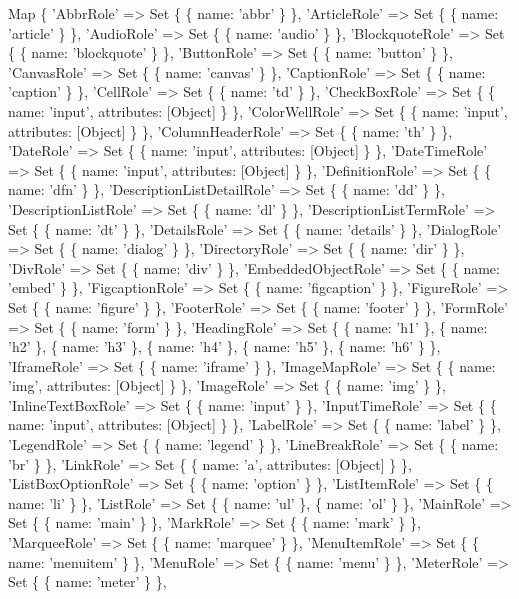 \begin{DoxyCode}
Map \{
  'AbbrRole' => Set \{ \{ name: 'abbr' \} \},
  'ArticleRole' => Set \{ \{ name: 'article' \} \},
  'AudioRole' => Set \{ \{ name: 'audio' \} \},
  'BlockquoteRole' => Set \{ \{ name: 'blockquote' \} \},
  'ButtonRole' => Set \{ \{ name: 'button' \} \},
  'CanvasRole' => Set \{ \{ name: 'canvas' \} \},
  'CaptionRole' => Set \{ \{ name: 'caption' \} \},
  'CellRole' => Set \{ \{ name: 'td' \} \},
  'CheckBoxRole' => Set \{ \{ name: 'input', attributes: [Object] \} \},
  'ColorWellRole' => Set \{ \{ name: 'input', attributes: [Object] \} \},
  'ColumnHeaderRole' => Set \{ \{ name: 'th' \} \},
  'DateRole' => Set \{ \{ name: 'input', attributes: [Object] \} \},
  'DateTimeRole' => Set \{ \{ name: 'input', attributes: [Object] \} \},
  'DefinitionRole' => Set \{ \{ name: 'dfn' \} \},
  'DescriptionListDetailRole' => Set \{ \{ name: 'dd' \} \},
  'DescriptionListRole' => Set \{ \{ name: 'dl' \} \},
  'DescriptionListTermRole' => Set \{ \{ name: 'dt' \} \},
  'DetailsRole' => Set \{ \{ name: 'details' \} \},
  'DialogRole' => Set \{ \{ name: 'dialog' \} \},
  'DirectoryRole' => Set \{ \{ name: 'dir' \} \},
  'DivRole' => Set \{ \{ name: 'div' \} \},
  'EmbeddedObjectRole' => Set \{ \{ name: 'embed' \} \},
  'FigcaptionRole' => Set \{ \{ name: 'figcaption' \} \},
  'FigureRole' => Set \{ \{ name: 'figure' \} \},
  'FooterRole' => Set \{ \{ name: 'footer' \} \},
  'FormRole' => Set \{ \{ name: 'form' \} \},
  'HeadingRole' => Set \{ \{ name: 'h1' \}, \{ name: 'h2' \}, \{ name: 'h3' \}, \{ name: 'h4' \}, \{ name: 'h5' \}, \{
       name: 'h6' \} \},
  'IframeRole' => Set \{ \{ name: 'iframe' \} \},
  'ImageMapRole' => Set \{ \{ name: 'img', attributes: [Object] \} \},
  'ImageRole' => Set \{ \{ name: 'img' \} \},
  'InlineTextBoxRole' => Set \{ \{ name: 'input' \} \},
  'InputTimeRole' => Set \{ \{ name: 'input', attributes: [Object] \} \},
  'LabelRole' => Set \{ \{ name: 'label' \} \},
  'LegendRole' => Set \{ \{ name: 'legend' \} \},
  'LineBreakRole' => Set \{ \{ name: 'br' \} \},
  'LinkRole' => Set \{ \{ name: 'a', attributes: [Object] \} \},
  'ListBoxOptionRole' => Set \{ \{ name: 'option' \} \},
  'ListItemRole' => Set \{ \{ name: 'li' \} \},
  'ListRole' => Set \{ \{ name: 'ul' \}, \{ name: 'ol' \} \},
  'MainRole' => Set \{ \{ name: 'main' \} \},
  'MarkRole' => Set \{ \{ name: 'mark' \} \},
  'MarqueeRole' => Set \{ \{ name: 'marquee' \} \},
  'MenuItemRole' => Set \{ \{ name: 'menuitem' \} \},
  'MenuRole' => Set \{ \{ name: 'menu' \} \},
  'MeterRole' => Set \{ \{ name: 'meter' \} \},

\end{DoxyCode}
